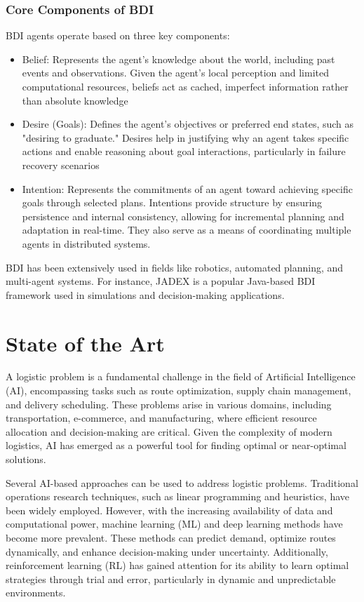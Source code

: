 \subsubsection{Core Components of BDI}
BDI agents operate based on three key components:
\begin{itemize}
  \item Belief: Represents the agent’s knowledge about the world, including past
    events and observations. Given the agent's local perception and limited
    computational resources, beliefs act as cached, imperfect information rather
    than absolute knowledge

  \item Desire (Goals): Defines the agent’s objectives or preferred end states, such
    as "desiring to graduate." Desires help in justifying why an agent takes
    specific actions and enable reasoning about goal interactions, particularly in
    failure recovery scenarios

  \item Intention: Represents the commitments of an agent toward achieving
    specific goals through selected plans. Intentions provide structure by ensuring
    persistence and internal consistency, allowing for incremental planning and
    adaptation in real-time. They also serve as a means of coordinating multiple
    agents in distributed systems.
\end{itemize}

BDI has been extensively used in fields like robotics, automated planning, and
multi-agent systems. For instance, JADEX is a popular Java-based BDI framework
used in simulations and decision-making applications.

\section{State of the Art}
\label{sec:state_of_the_art}

A logistic problem is a fundamental challenge in the field of Artificial Intelligence
(AI), encompassing tasks such as route optimization, supply chain management,
and delivery scheduling. These problems arise in various domains, including
transportation, e-commerce, and manufacturing, where efficient resource allocation
and decision-making are critical. Given the complexity of modern logistics, AI has
emerged as a powerful tool for finding optimal or near-optimal solutions.

Several AI-based approaches can be used to address logistic problems.
Traditional operations research techniques, such as linear programming and heuristics,
have been widely employed. However, with the increasing availability of data and
computational power, machine learning (ML) and deep learning methods have become
more prevalent. These methods can predict demand, optimize routes dynamically,
and enhance decision-making under uncertainty. Additionally, reinforcement
learning (RL) has gained attention for its ability to learn optimal strategies
through trial and error, particularly in dynamic and unpredictable environments.

